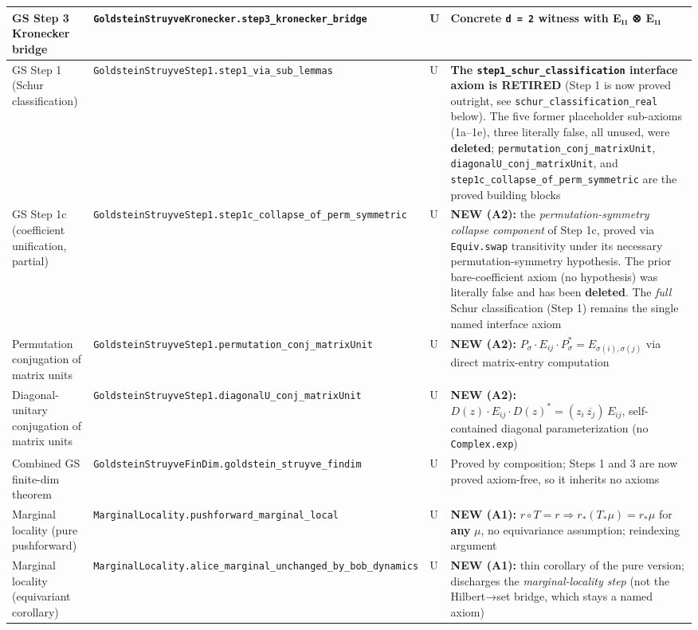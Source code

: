 \documentclass[11pt,a4paper]{article}
\begin{document}
\begin{center}
\begin{tabularx}{\linewidth}{|Y|Y|Y|Y|}
\hline
GS Step 3 Kronecker bridge & \texttt{GoldsteinStruyveKronecker.step3\_kronecker\_bridge} & U & Concrete \texttt{d = 2} witness with E₁₁ ⊗ E₁₁ \\
\hline
GS Step 1 (Schur classification) & \texttt{GoldsteinStruyveStep1.step1\_via\_sub\_lemmas} & U & \textbf{The \texttt{step1\_schur\_classification} interface axiom is RETIRED} (Step 1 is now proved outright, see \texttt{schur\_classification\_real} below). The five former placeholder sub-axioms (1a–1e), three literally false, all unused, were \textbf{deleted}; \texttt{permutation\_conj\_matrixUnit}, \texttt{diagonalU\_conj\_matrixUnit}, and \texttt{step1c\_collapse\_of\_perm\_symmetric} are the proved building blocks \\
\hline
GS Step 1c (coefficient unification, partial) & \texttt{GoldsteinStruyveStep1.step1c\_collapse\_of\_perm\_symmetric} & U & \textbf{NEW (A2):} the \emph{permutation-symmetry collapse component} of Step 1c, proved via \texttt{Equiv.swap} transitivity under its necessary permutation-symmetry hypothesis. The prior bare-coefficient axiom (no hypothesis) was literally false and has been \textbf{deleted}. The \emph{full} Schur classification (Step 1) remains the single named interface axiom \\
\hline
Permutation conjugation of matrix units & \texttt{GoldsteinStruyveStep1.permutation\_conj\_matrixUnit} & U & \textbf{NEW (A2):} $P_\sigma \cdot E_{ij} \cdot P_\sigma^* = E_{\sigma(i),\sigma(j)}$ via direct matrix-entry computation \\
\hline
Diagonal-unitary conjugation of matrix units & \texttt{GoldsteinStruyveStep1.diagonalU\_conj\_matrixUnit} & U & \textbf{NEW (A2):} $D(z)\cdot E_{ij}\cdot D(z)^* = (z_i\,\overline{z_j})\,E_{ij}$, self-contained diagonal parameterization (no \texttt{Complex.exp}) \\
\hline
Combined GS finite-dim theorem & \texttt{GoldsteinStruyveFinDim.goldstein\_struyve\_findim} & U & Proved by composition; Steps 1 and 3 are now proved axiom-free, so it inherits no axioms \\
\hline
Marginal locality (pure pushforward) & \texttt{MarginalLocality.pushforward\_marginal\_local} & U & \textbf{NEW (A1):} $r\circ T = r \Rightarrow r_*(T_*\mu) = r_*\mu$ for \textbf{any} $\mu$, no equivariance assumption; reindexing argument \\
\hline
Marginal locality (equivariant corollary) & \texttt{MarginalLocality.alice\_marginal\_unchanged\_by\_bob\_dynamics} & U & \textbf{NEW (A1):} thin corollary of the pure version; discharges the \emph{marginal-locality step} (not the Hilbert→set bridge, which stays a named axiom) \\

\end{tabularx}
\end{center}
\end{document}
